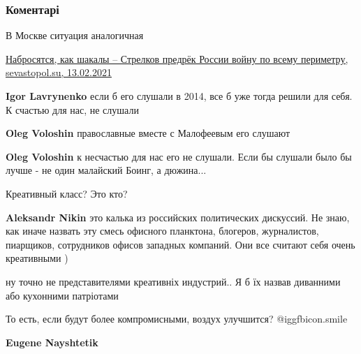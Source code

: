  
 
 
 
 
\subsubsection{Коментарі}

\begin{itemize} %
В Москве ситуация аналогичная

\href{https://sevastopol.su/news/nabrosyatsya-kak-shakaly-strelkov-predrek-rossii-voynu-po-vsemu-perimetru}{%
Набросятся, как шакалы – Стрелков предрёк России войну по всему периметру, sevastopol.su, 13.02.2021%
}

\begin{itemize} %
\textbf{Igor Lavrynenko} если б его слушали в 2014, все б уже тогда решили для себя. К счастью для нас, не слушали

\textbf{Oleg Voloshin} православные вместе с Малофеевым его слушают

\textbf{Oleg Voloshin} к несчастью для нас его не слушали. Если бы слушали было бы лучше - не один малайский Боинг, а дюжина...
\end{itemize} %

Креативный класс? Это кто?

\begin{itemize} %
\textbf{Aleksandr Nikin} это калька из российских политических дискуссий. Не знаю, как иначе назвать эту смесь офисного планктона, блогеров, журналистов, пиарщиков, сотрудников офисов западных компаний. Они все считают себя очень креативными )

ну точно не представителями креативніх индустрий.. Я б їх назвав диванними або кухонними патріотами
\end{itemize} %

То есть, если будут более компромисными, воздух улучшится?  @igg{fbicon.smile} 

\begin{itemize} %
\textbf{Eugene Nayshtetik} 


\end{itemize}
\end{itemize}
